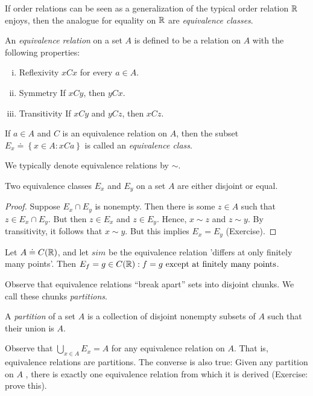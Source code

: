 If order relations can be seen as a generalization of the typical order relation
$\mathbb{R}$ enjoys, then the analogue for equality on $\mathbb{R}$ are \emph{equivalence
classes}.
\begin{definition}
	An \emph{equivalence relation} on a set $A$ is defined to be a relation on $A$
	with the following properties:
	\begin{enumerate}[(i)]
		\item{Reflexivity} $xCx$ for every $a \in A$.
		\item{Symmetry} If $xCy$, then $yCx$.
		\item{Transitivity} If $xCy$ and $yCz$, then $xCz$.
	\end{enumerate}
	If $a \in A$ and $C$ is an equivalence relation on $A$, then 
	the subset $E_{x} \doteq \left\{ x \in A: xCa  \right\}$ is called
	an \emph{equivalence class}.
\end{definition}
\begin{notation}
	We typically denote equivalence relations by $\sim$.
\end{notation}
\begin{lemma}\label{lem:}
	Two equivalence classes $E_{x}$ and $E_{y}$ on a set $A$ are 
	either disjoint or equal.
\end{lemma}
\begin{proof}
	Suppose $E_{x} \cap E_{y}$ is nonempty. Then there is some $z \in A$
	such that $z \in E_{x} \cap E_{y}$. But then $z \in E_{x}$ and
	$z \in E_{y}$. Hence, $x \sim z$ and $z \sim y$. By transitivity, it follows
	that $x \sim y$. But this implies $E_{x} = E_{y}$ (Exercise).		
\end{proof}
\begin{example}
	Let $A \doteq C(\mathbb{R})$, and let $sim$ be the equivalence relation 'differs at
	only finitely many points'. Then $E_{f} = {g \in C(\mathbb{R}): f=g \text{ except at
	finitely many points}}$.
\end{example}
Observe that equivalence relations ``break apart'' sets into disjoint chunks. We call
these chunks \emph{partitions}.
\begin{definition}
A \emph{partition} of a set $A$  is a collection of disjoint nonempty subsets of
$A$ such that their union is $A$.
\end{definition}
Observe that $\bigcup_{x \in A}  E_{x}  = A$ for any equivalence relation on
$A$. That is, equivalence relations are partitions. The converse is also true:
Given any partition on $A$ , there is exactly one equivalence relation from
which it is derived (Exercise: prove this).

